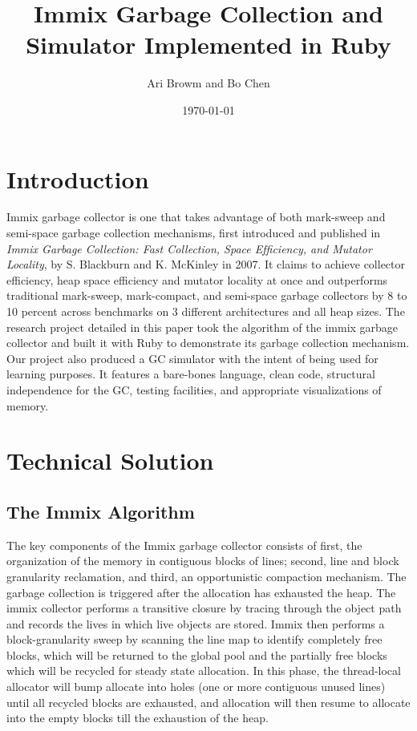 \documentclass{article}
\title{Immix Garbage Collection and Simulator Implemented in Ruby}
\author{Ari Browm and Bo Chen}
\date{\today}
\begin{document}
  \maketitle

  \section{Introduction}
  Immix garbage collector is one that takes advantage of both mark-sweep and
  semi-space garbage collection mechanisms, first introduced and published in
  \emph{Immix Garbage Collection: Fast Collection, Space Efﬁciency, and Mutator
  Locality}, by S. Blackburn and K. McKinley in 2007. It claims to achieve
  collector efficiency, heap space efficiency and mutator locality at once and
  outperforms traditional mark-sweep, mark-compact, and semi-space garbage
  collectors by 8 to 10 percent across benchmarks on 3 different architectures
  and all heap sizes. The research project detailed in this paper took the
  algorithm of the immix garbage collector and built it with Ruby to demonstrate
  its garbage collection mechanism. Our project also produced a GC simulator
  with the intent of being used for learning purposes. It features a bare-bones
  language, clean code, structural independence for the GC, testing facilities,
  and appropriate visualizations of memory.

  \section{Technical Solution}
  \subsection{The Immix Algorithm}
  The key components of the Immix garbage collector consists of first, the
  organization of the memory in contiguous blocks of lines; second, line and
  block granularity reclamation, and third, an opportunistic compaction
  mechanism. The garbage collection is triggered after the allocation has
  exhausted the heap. The immix collector performs a transitive closure by
  tracing through the object path and records the lives in which live objects
  are stored. Immix then performs a block-granularity sweep by scanning the line
  map to identify completely free blocks, which will be returned to the global
  pool and the partially free blocks which will be recycled for steady state
  allocation. In this phase, the thread-local allocator will bump allocate into
  holes (one or more contiguous unused lines) until all recycled blocks are
  exhausted, and allocation will then resume to allocate into the empty blocks
  till the exhaustion of the heap. \\
\end{document}

